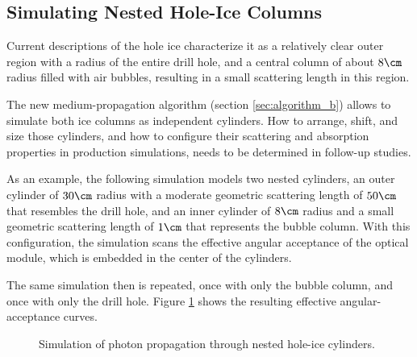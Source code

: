 
\subsection{Simulating Nested Hole-Ice Columns}
\label{sec:nested_cylinders}

Current descriptions of the hole ice characterize it as a relatively clear outer region with a radius of the entire drill hole, and a central column of about $8\cm$ radius filled with air bubbles, resulting in a small scattering length in this region. \cite{instrumentation,icrc17pocam,rongenswedishcamera,martinspicehddard}


The new medium-propagation algorithm (section \ref{sec:algorithm_b}) allows to simulate both ice columns as independent cylinders. How to arrange, shift, and size those cylinders, and how to configure their scattering and absorption properties in production simulations, needs to be determined in follow-up studies.\followup

As an example, the following simulation models two nested cylinders, an outer cylinder of $30\cm$ radius with a moderate geometric scattering length of $50\cm$ that resembles the drill hole, and an inner cylinder of $8\cm$ radius and a small geometric scattering length of $1\cm$ that represents the bubble column. With this configuration, the simulation scans the effective angular acceptance of the optical module, which is embedded in the center of the cylinders.


The same simulation then is repeated, once with only the bubble column, and once with only the drill hole. Figure \ref{fig:haiv2IGi} shows the resulting effective angular-acceptance curves.

\begin{figure}[htbp]
  \hfill
  \caption{Simulation of photon propagation through nested hole-ice cylinders.}
  \label{fig:haiv2IGi}
\end{figure}

